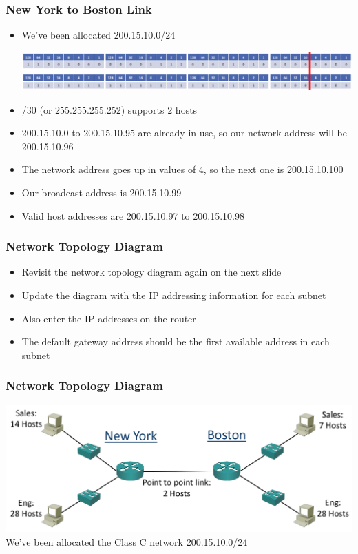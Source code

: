 \documentclass[pdflatex,compress]{beamer}
\begin{document}
\begin{frame}
	\frametitle{New York to Boston Link}
	\begin{itemize}
		\item We’ve been allocated 200.15.10.0/24
		\begin{center}
			\includegraphics[width=\linewidth]{img/img12}
		\end{center}
		\item /30 (or 255.255.255.252) supports 2 hosts
		\item 200.15.10.0 to 200.15.10.95 are already in use, so our network address will be 200.15.10.96
		\item The network address goes up in values of 4, so the next one is 200.15.10.100
		\item Our broadcast address is 200.15.10.99
		\item Valid host addresses are 200.15.10.97 to 200.15.10.98
	\end{itemize}
\end{frame}

\begin{frame}
	\frametitle{Network Topology Diagram}
	\begin{itemize}
		\item Revisit the network topology diagram again on the next slide
		\item Update the diagram with the IP addressing information for each subnet
		\item Also enter the IP addresses on the router
		\item The default gateway address should be the first available address in each subnet
	\end{itemize}
\end{frame}

\begin{frame}
	\frametitle{Network Topology Diagram}
	\begin{center}
		\includegraphics[width=\linewidth]{img/img14}
		We've been allocated the Class C network 200.15.10.0/24
	\end{center}
\end{frame}
\end{document}
